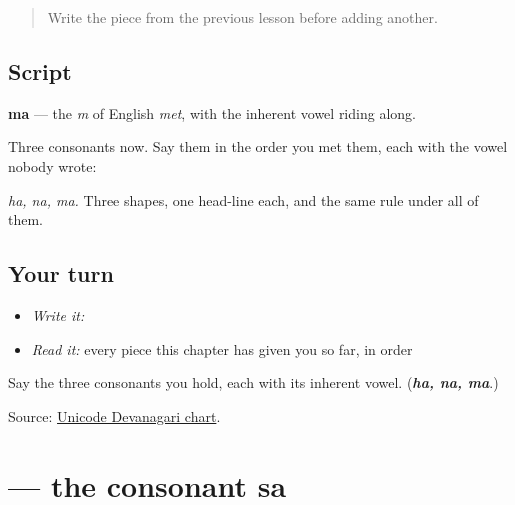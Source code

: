 \label{lesson:MR-W01-ma}



\begin{quote}
Write the piece from the previous lesson before adding another.
\end{quote}

\subsection*{Script}

\begin{quote}
\end{quote}

\textbf{ma} — the \emph{m} of English \emph{met}, with the inherent vowel riding along.

Three consonants now. Say them in the order you met them, each with the vowel nobody wrote:

\begin{quote}
\textbf{}   \textbf{}   \textbf{}
\end{quote}

\emph{ha, na, ma.} Three shapes, one head-line each, and the same rule under all of them.

\subsection*{Your turn}
\begin{itemize}
\raggedright
  \item \emph{Write it:} 
  \item \emph{Read it:} every piece this chapter has given you so far, in order
\end{itemize}

\begin{tcolorbox}[breakable,colback=teal!4,colframe=teal!35!black,title={Before you move on}]
Say the three consonants you hold, each with its inherent vowel. (\emph{\textbf{ha, na, ma}}.)

Source: \href{https://www.unicode.org/charts/PDF/U0900.pdf}{Unicode Devanagari chart}.
\end{tcolorbox}
\section[\texorpdfstring{\mr{स} (sa)}{स (sa)}]{ — the consonant sa}

